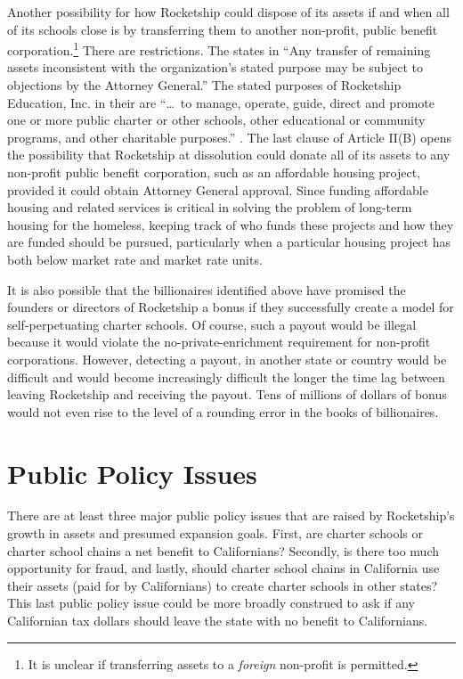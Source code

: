 Another possibility for how Rocketship could dispose of its assets if and when all of its schools close is by transferring them to another non-profit, public benefit corporation.\footnote{It is unclear if transferring assets to a \textit{foreign} non-profit is permitted.} There are restrictions. The \citeauthor{CALDOJ2014} states in  ``Any transfer of remaining assets inconsistent with the organization’s stated purpose may be subject to objections by the Attorney General.'' The stated purposes of Rocketship Education, Inc. in their  are ``\ldots~to manage, operate, guide, direct and promote one or more public charter or other schools, other educational or community programs, and other charitable purposes.'' \parencite[1]{RSED2022}. The last clause of Article II(B) opens the possibility that Rocketship at dissolution could donate all of its assets to any non-profit public benefit corporation, such as an affordable housing project, provided it could obtain Attorney General approval.  Since funding affordable housing and related services is critical in solving the problem of long-term housing for the homeless, keeping track of who funds these projects and how they are funded should be pursued, particularly when a particular housing project has both below market rate and market rate units.

It is also possible that the billionaires identified above have promised the founders or directors of Rocketship a bonus if they successfully create a model for self-perpetuating charter schools. Of course, such a payout would be illegal because it would violate the no-private-enrichment requirement for non-profit corporations. However, detecting a payout, in another state or country would be difficult and would become increasingly difficult the longer the time lag between leaving Rocketship and receiving the payout. Tens of millions of dollars of bonus would not even rise to the level of a rounding error in the books of billionaires.

\section{Public Policy Issues}%
\label{sec:publ-policy-chang}\indent%

There are at least three major public policy issues that are raised by Rocketship's growth in assets and presumed expansion goals. First, are charter schools or charter school chains a net benefit to Californians? Secondly, is there too much opportunity for fraud, and lastly, should charter school chains in California use their assets (paid for by Californians) to create charter schools in other states? This last public policy issue could be more broadly construed to ask if any Californian tax dollars should leave the state with no benefit to Californians.

